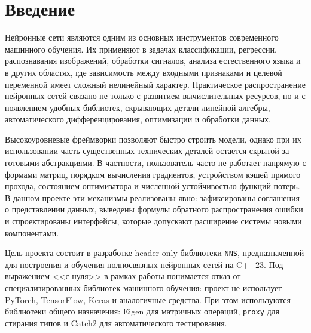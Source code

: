 \documentclass{article}
\begin{document}
\makeTitlePage
\tableofcontents

\begin{abstract}
Проект посвящен разработке библиотеки \texttt{NNS} для построения и
обучения полносвязных нейронных сетей на языке C++23 без использования
готовых фреймворков машинного обучения. В отчете рассматриваются
математическая модель прямого и обратного прохода, архитектура
программной реализации, организация обобщенных интерфейсов через
стирание типов, реализация функций потерь, оптимизаторов, загрузки
данных и обучающего цикла. Приводится пример обучения на датасете
\texttt{MNIST}.
\end{abstract}

\section{Введение}

Нейронные сети являются одним из основных инструментов современного
машинного обучения. Их применяют в задачах классификации, регрессии,
распознавания изображений, обработки сигналов, анализа естественного
языка и в других областях, где зависимость между входными признаками и
целевой переменной имеет сложный нелинейный характер. Практическое
распространение нейронных сетей связано не только с развитием
вычислительных ресурсов, но и с появлением удобных библиотек,
скрывающих детали линейной алгебры, автоматического дифференцирования,
оптимизации и обработки данных.

Высокоуровневые фреймворки позволяют быстро строить модели, однако при
их использовании часть существенных технических деталей остается
скрытой за готовыми абстракциями. В частности, пользователь часто не
работает напрямую с формами матриц, порядком вычисления градиентов,
устройством кэшей прямого прохода, состоянием оптимизатора и численной
устойчивостью функций потерь. В данном проекте эти механизмы
реализованы явно: зафиксированы соглашения о представлении данных,
выведены формулы обратного распространения ошибки и спроектированы
интерфейсы, которые допускают расширение системы новыми компонентами.

Цель проекта состоит в разработке header-only библиотеки \texttt{NNS},
предназначенной для построения и обучения полносвязных нейронных сетей
на C++23. Под выражением <<с нуля>> в рамках работы понимается отказ
от специализированных библиотек машинного обучения: проект не
использует PyTorch, TensorFlow, Keras и аналогичные средства. При этом
используются библиотеки общего назначения: Eigen для матричных
операций, \texttt{proxy} для стирания типов и Catch2 для
автоматического тестирования.
\end{document}

